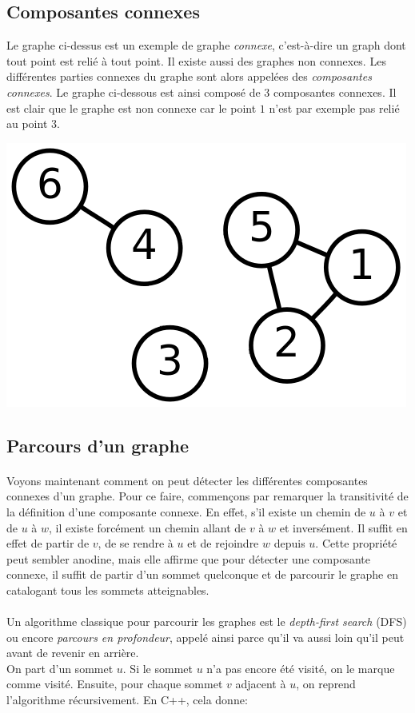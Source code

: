 \documentclass{article}
\begin{document}

\subsection{Composantes connexes}
Le graphe ci-dessus est un exemple de graphe \textit{connexe}, c'est-à-dire un graph dont tout point est relié à tout point. Il existe aussi des graphes non connexes. Les différentes parties connexes du graphe sont alors appelées des \textit{composantes connexes}. Le graphe ci-dessous est ainsi composé de $3$ composantes connexes. Il est clair que le graphe est non connexe car le point $1$ n'est par exemple pas relié au point $3$.

\begin{center}
\includegraphics[width=0.5\linewidth]{images/3-components.png}
\end{center}

\subsection{Parcours d'un graphe}
\paragraph{}
Voyons maintenant comment on peut détecter les différentes composantes connexes d'un graphe. Pour ce faire, commençons par remarquer la transitivité de la définition d'une composante connexe. En effet, s'il existe un chemin de $u$ à $v$ et de $u$ à $w$, il existe forcément un chemin allant de $v$ à $w$ et inversément. Il suffit en effet de partir de $v$, de se rendre à $u$ et de rejoindre $w$ depuis $u$. Cette propriété peut sembler anodine, mais elle affirme que pour détecter une composante connexe, il suffit de partir d'un sommet quelconque et de parcourir le graphe en catalogant tous les sommets atteignables.

\paragraph{}
Un algorithme classique pour parcourir les graphes est le \textit{depth-first search} (DFS) ou encore \textit{parcours en profondeur}, appelé ainsi parce qu'il va aussi loin qu'il peut avant de revenir en arrière. \\
On part d'un sommet $u$. Si le sommet $u$ n'a pas encore été visité, on le marque comme visité. Ensuite, pour chaque sommet $v$ adjacent à $u$, on reprend l'algorithme récursivement. En C++, cela donne:
\end{document}
